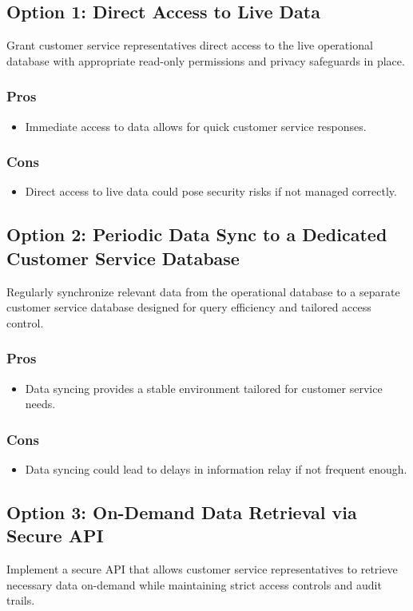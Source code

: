 \subsection*{Option 1: Direct Access to Live Data}
Grant customer service representatives direct access to the live operational database with appropriate read-only permissions and privacy safeguards in place.
\subsubsection*{Pros}
\begin{itemize}
    \item Immediate access to data allows for quick customer service responses.
\end{itemize}
\subsubsection*{Cons}
\begin{itemize}
    \item Direct access to live data could pose security risks if not managed correctly.
\end{itemize}

\subsection*{Option 2: Periodic Data Sync to a Dedicated Customer Service Database}
Regularly synchronize relevant data from the operational database to a separate customer service database designed for query efficiency and tailored access control.
\subsubsection*{Pros}
\begin{itemize}
    \item Data syncing provides a stable environment tailored for customer service needs.
\end{itemize}
\subsubsection*{Cons}
\begin{itemize}
    \item Data syncing could lead to delays in information relay if not frequent enough.
\end{itemize}

\subsection*{Option 3: On-Demand Data Retrieval via Secure API}
Implement a secure API that allows customer service representatives to retrieve necessary data on-demand while maintaining strict access controls and audit trails.
